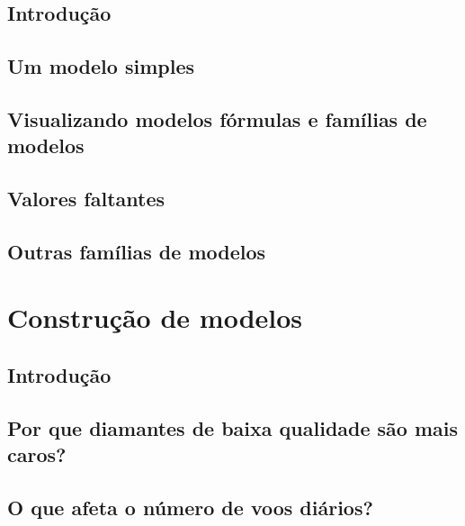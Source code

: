 \documentclass[
]{latex/krantz}
\theoremstyle{definition}
\theoremstyle{definition}
\theoremstyle{definition}
\theoremstyle{definition}
\theoremstyle{remark}
\begin{document}
\hypertarget{introduuxe7uxe3o-14}{%
\section{Introdução}\label{introduuxe7uxe3o-14}}

\hypertarget{um-modelo-simples}{%
\section{Um modelo simples}\label{um-modelo-simples}}

\hypertarget{visualizando-modelos-fuxf3rmulas-e-famuxedlias-de-modelos}{%
\section{Visualizando modelos fórmulas e famílias de modelos}\label{visualizando-modelos-fuxf3rmulas-e-famuxedlias-de-modelos}}

\hypertarget{valores-faltantes-2}{%
\section{Valores faltantes}\label{valores-faltantes-2}}

\hypertarget{outras-famuxedlias-de-modelos}{%
\section{Outras famílias de modelos}\label{outras-famuxedlias-de-modelos}}

\hypertarget{construuxe7uxe3o-de-modelos}{%
\chapter{Construção de modelos}\label{construuxe7uxe3o-de-modelos}}

\hypertarget{introduuxe7uxe3o-15}{%
\section{Introdução}\label{introduuxe7uxe3o-15}}

\hypertarget{por-que-diamantes-de-baixa-qualidade-suxe3o-mais-caros}{%
\section{Por que diamantes de baixa qualidade são mais caros?}\label{por-que-diamantes-de-baixa-qualidade-suxe3o-mais-caros}}

\hypertarget{o-que-afeta-o-nuxfamero-de-voos-diuxe1rios}{%
\section{O que afeta o número de voos diários?}\label{o-que-afeta-o-nuxfamero-de-voos-diuxe1rios}}
\end{document}
